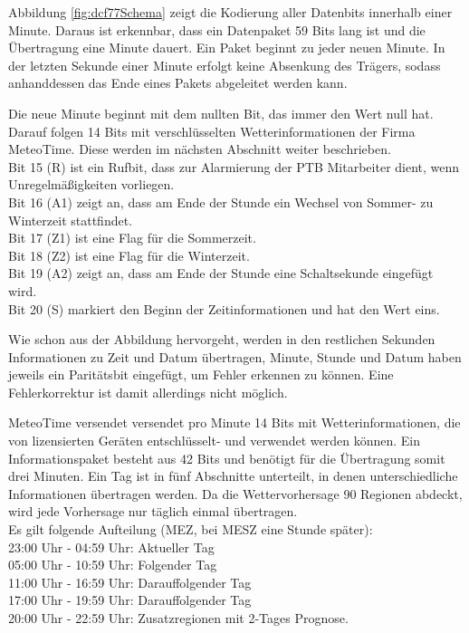 \documentclass[a4paper,11pt]{article}
\newcounter{subsubsubsection}[subsubsection]
\begin{document}
\noindent
Abbildung \ref{fig:dcf77Schema} zeigt die Kodierung aller Datenbits innerhalb einer Minute. Daraus ist erkennbar, dass ein Datenpaket 59 Bits lang ist und
die Übertragung eine Minute dauert. Ein Paket beginnt zu jeder neuen Minute. In der letzten Sekunde einer Minute erfolgt keine Absenkung des Trägers, sodass anhanddessen
das Ende eines Pakets abgeleitet werden kann. 

\vspace{0.2cm}
\noindent
Die neue Minute beginnt mit dem nullten Bit, das immer den Wert null hat. Darauf folgen 14 Bits mit verschlüsselten Wetterinformationen der Firma MeteoTime.
Diese werden im nächsten Abschnitt weiter beschrieben. \\
Bit 15 (R) ist ein Rufbit, dass zur Alarmierung der PTB Mitarbeiter dient, wenn Unregelmäßigkeiten vorliegen. \\
Bit 16 (A1) zeigt an, dass am Ende der Stunde ein Wechsel von Sommer- zu Winterzeit stattfindet. \\
Bit 17 (Z1) ist eine Flag für die Sommerzeit. \\
Bit 18 (Z2) ist eine Flag für die Winterzeit. \\
Bit 19 (A2) zeigt an, dass am Ende der Stunde eine Schaltsekunde eingefügt wird. \\
Bit 20 (S) markiert den Beginn der Zeitinformationen und hat den Wert eins. 

\vspace{0.2cm}
\noindent
Wie schon aus der Abbildung hervorgeht, werden in den restlichen Sekunden Informationen zu Zeit und Datum übertragen, Minute, Stunde und Datum haben jeweils ein
Paritätsbit eingefügt, um Fehler erkennen zu können. Eine Fehlerkorrektur ist damit allerdings nicht möglich. 

\label{subsubsubsub:meteotime}

MeteoTime versendet versendet pro Minute 14 Bits mit Wetterinformationen, die von lizensierten Geräten entschlüsselt- und verwendet werden können. 
Ein Informationspaket besteht aus 42 Bits und benötigt für die Übertragung somit drei Minuten. Ein Tag ist in fünf Abschnitte unterteilt, in denen
unterschiedliche Informationen übertragen werden. Da die Wettervorhersage 90 Regionen abdeckt, wird jede Vorhersage nur täglich einmal übertragen. \\
Es gilt folgende Aufteilung (MEZ, bei MESZ eine Stunde später): \\
23:00 Uhr - 04:59 Uhr: Aktueller Tag \\
05:00 Uhr - 10:59 Uhr: Folgender Tag \\
11:00 Uhr - 16:59 Uhr: Darauffolgender Tag \\
17:00 Uhr - 19:59 Uhr: Darauffolgender Tag \\
20:00 Uhr - 22:59 Uhr: Zusatzregionen mit 2-Tages Prognose. 
\end{document}
